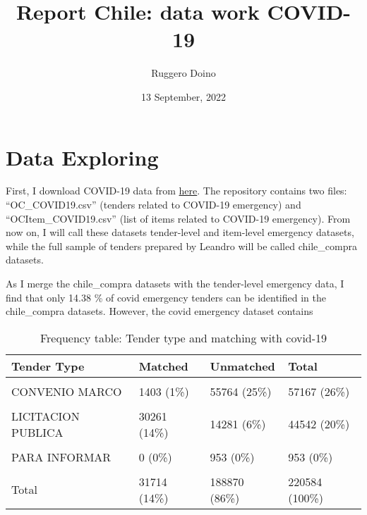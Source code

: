 \documentclass[
]{article}
\title{Report Chile: data work COVID-19}
\author{Ruggero Doino}
\date{13 September, 2022}
\begin{document}
\maketitle

{
\setcounter{tocdepth}{2}
\tableofcontents
}
\hypertarget{data-exploring}{%
\section{Data Exploring}\label{data-exploring}}

First, I download COVID-19 data from
\href{https://app.powerbi.com/view?r=eyJrIjoiNmU2NzBkNzUtYmM1Mi00NGVmLTljYWQtNTIxNTlhMTQ4ZjQ5IiwidCI6ImIwMGQ1ZjQ5LTk4YWMtNGJjNS1hMmM5LWNhZmRmNzEyMTZmMCIsImMiOjR9}{here}.
The repository contains two files: ``OC\_COVID19.csv'' (tenders related
to COVID-19 emergency) and ``OCItem\_COVID19.csv'' (list of items
related to COVID-19 emergency). From now on, I will call these datasets
tender-level and item-level emergency datasets, while the full sample of
tenders prepared by Leandro will be called chile\_compra datasets.

As I merge the chile\_compra datasets with the tender-level emergency
data, I find that only 14.38 \% of covid emergency tenders can be
identified in the chile\_compra datasets. However, the covid emergency
dataset contains

\begin{longtable}[t]{llll}
\caption{\label{tab:freq table for tag}Frequency table: Tender type and matching with covid-19}\\
\toprule
Tender Type & Matched & Unmatched & Total\\
\midrule
\cellcolor{gray!6}{COMPRA AGIL} & \cellcolor{gray!6}{0  (0\%)} & \cellcolor{gray!6}{38096 (17\%)} & \cellcolor{gray!6}{38096  (17\%)}\\
CONVENIO MARCO & 1403  (1\%) & 55764 (25\%) & 57167  (26\%)\\
\cellcolor{gray!6}{LICITACION PRIVADA} & \cellcolor{gray!6}{49  (0\%)} & \cellcolor{gray!6}{246  (0\%)} & \cellcolor{gray!6}{295   (0\%)}\\
LICITACION PUBLICA & 30261 (14\%) & 14281  (6\%) & 44542  (20\%)\\
\cellcolor{gray!6}{MICROCOMPRA} & \cellcolor{gray!6}{0  (0\%)} & \cellcolor{gray!6}{4  (0\%)} & \cellcolor{gray!6}{4   (0\%)}\\
\addlinespace
PARA INFORMAR & 0  (0\%) & 953  (0\%) & 953   (0\%)\\
\cellcolor{gray!6}{TRATO DIRECTO} & \cellcolor{gray!6}{1  (0\%)} & \cellcolor{gray!6}{79526 (36\%)} & \cellcolor{gray!6}{79527  (36\%)}\\
Total & 31714 (14\%) & 188870 (86\%) & 220584 (100\%)\\
\bottomrule
\end{longtable}
\end{document}
